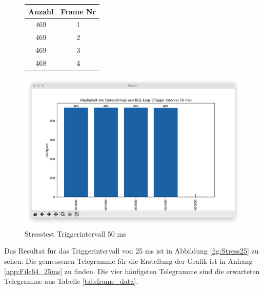 \begin{figure}[H]
    \centering
    \begin{minipage}{0.29 \textwidth}
        \begin{tabular}{c||c}
            \toprule
            \textbf{Anzahl} & \textbf{Frame Nr} \\ 
            \midrule
            469 &  1\\
            469 & 2 \\
            469 & 3 \\
            468 & 4 \\
            \bottomrule
        \end{tabular}
    \end{minipage}
    \hfill
    \begin{minipage}{0.7 \textwidth}
        \includegraphics[width = \linewidth]{Figures/Chap4/Stesstest/Stress_50.png}
    \caption{Stresstest Triggerintervall 50 ms}
    \label{fig:Stress50}
    \end{minipage}
\end{figure}


Das Resultat für das Triggerintervall von 25 ms ist in Abbildung \ref{fig:Stress25} zu sehen. Die gemessenen Telegramme für die Erstellung der Grafik ist in Anhang \ref{app:File64_25ms} zu finden. Die vier häufigsten Telegramme sind die erwarteten Telegramme aus Tabelle \ref{tab:frame_data}.

